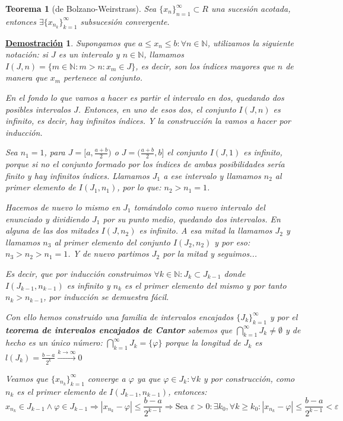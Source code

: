 \documentclass[10pt,a4paper,openright]{book}
\theoremstyle{break}
\newtheorem{theo}{Teorema}[chapter]
\newtheorem*{demo}{\underline{Demostración}}
\begin{document}
\begin{theo}[de Bolzano-Weirstrass]
Sea $\{x_n\}_{n=1}^\infty\subset R$ una sucesión acotada, entonces $\exists \{x_{n_k}\}_{k=1}^\infty$ subsucesión convergente.
\end{theo}
\begin{demo}
Supongamos que $a\leq x_n\leq b: \forall n\in \mathbb N$, utilizamos la siguiente notación: si $J$ es un intervalo y $n\in \mathbb N$, llamamos $I(J,n)=\{m\in \mathbb N :m>n: x_m\in J\}$, es decir, son los índices mayores que $n$ de manera que $x_m$ pertenece al conjunto.\par

En el fondo lo que vamos a hacer es partir el intervalo en dos, quedando dos posibles intervalos $J$. Entonces, en uno de esos dos, el conjunto $I(J,n)$ es infinito, es decir, hay infinitos índices. Y la construcción la vamos a hacer por inducción.

Sea $n_1=1$, para $J=[a, \frac{a+b}{2})$ o $J=(\frac{a+b}{2},b]$ el conjunto $I(J,1)$ es infinito, porque si no el conjunto formado por los índices de ambas posibilidades sería finito y hay infinitos índices. Llamamos $J_1$ a ese intervalo y llamamos $n_2$ al primer elemento de $I(J_1,n_1)$, por lo que: $n_2>n_1=1$.\par

Hacemos de nuevo lo mismo en $J_1$ tomándolo como nuevo intervalo del enunciado y dividiendo $J_1$ por su punto medio, quedando dos intervalos. En alguna de las dos mitades $I(J, n_2)$ es infinito. A esa mitad la llamamos $J_2$ y llamamos $n_3$ al primer elemento del conjunto $I(J_2,n_2)$ y por eso: $n_3>n_2>n_1=1$. Y de nuevo partimos $J_2$ por la mitad y seguimos...\par

Es decir, que por inducción construimos $\forall k\in \mathbb N: J_k\subset J_{k-1}$ donde $I(J_{k-1},n_{k-1})$ es infinito y $n_{k}$ es el primer elemento del mismo y por tanto $n_k>n_{k-1}$, por inducción se demuestra fácil.\par

Con ello hemos construido una familia de intervalos encajados $\{J_k\}_{k=1}^\infty$ y por el \textbf{teorema de intervalos encajados de Cantor} sabemos que $\bigcap_{k=1}^\infty J_k\neq \emptyset$ y de hecho es un único número: $\bigcap_{k=1}^\infty J_k=\{\varphi\}$ porque la longitud de $J_k$ es $l(J_k)=\frac{b-a}{2^k}\xrightarrow{k\rightarrow \infty} 0$\par

Veamos que $\{x_{n_k}\}_{k=1}^\infty$ converge a $\varphi$ ya que $\varphi\in J_k: \forall k$ y por construcción, como $n_k$ es el primer elemento de $I(J_{k-1},n_{k-1})$, entonces:
$$x_{n_k}\in J_{k-1}\wedge \varphi\in J_{k-1}\Rightarrow \left|x_{n_k}-\varphi\right|\leq \frac{b-a}{2^{k-1}}\Rightarrow \mbox{Sea }\varepsilon>0:\exists k_0, \forall k\geq k_0 : \left|x_{n_k}-\varphi\right|\leq \frac{b-a}{2^{k-1}}<\varepsilon$$
\end{demo}
\end{document}

